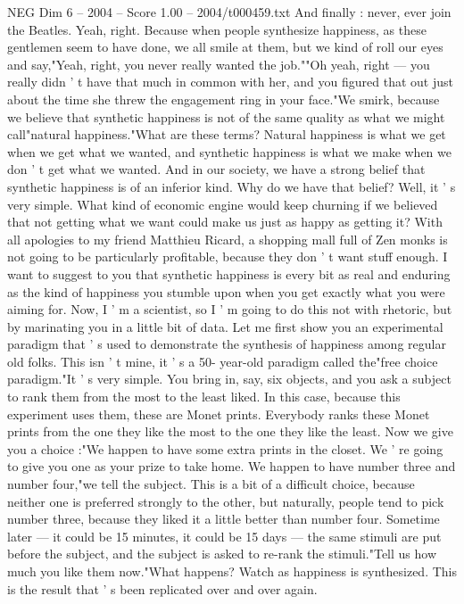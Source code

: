 \begin{textsample}{NEG Dim 6 – 2004 – Score 1.00 – 2004/t000459.txt}
And finally : never, ever join the Beatles.
Yeah, right.
Because when people synthesize happiness, as these gentlemen seem to have done, we all smile at them, but we kind of roll our eyes and say,"Yeah, right, you never really wanted the job.""Oh yeah, right — you really didn ' t have that much in common with her, and you figured that out just about the time she threw the engagement ring in your face."We smirk, because we believe that synthetic happiness is not of the same quality as what we might call"natural happiness."What are these terms?
Natural happiness is what we get when we get what we wanted, and synthetic happiness is what we make when we don ' t get what we wanted.
And in our society, we have a strong belief that synthetic happiness is of an inferior kind.
Why do we have that belief?
Well, it ' s very simple.
What kind of economic engine would keep churning if we believed that not getting what we want could make us just as happy as getting it?
With all apologies to my friend Matthieu Ricard, a shopping mall full of Zen monks is not going to be particularly profitable, because they don ' t want stuff enough.
I want to suggest to you that synthetic happiness is every bit as real and enduring as the kind of happiness you stumble upon when you get exactly what you were aiming for.
Now, I ' m a scientist, so I ' m going to do this not with rhetoric, but by marinating you in a little bit of data.
Let me first show you an experimental paradigm that ' s used to demonstrate the synthesis of happiness among regular old folks.
This isn ' t mine, it ' s a 50- year-old paradigm called the"free choice paradigm."It ' s very simple.
You bring in, say, six objects, and you ask a subject to rank them from the most to the least liked.
In this case, because this experiment uses them, these are Monet prints.
Everybody ranks these Monet prints from the one they like the most to the one they like the least.
Now we give you a choice :"We happen to have some extra prints in the closet.
We ' re going to give you one as your prize to take home.
We happen to have number three and number four,"we tell the subject.
This is a bit of a difficult choice, because neither one is preferred strongly to the other, but naturally, people tend to pick number three, because they liked it a little better than number four.
Sometime later — it could be 15 minutes, it could be 15 days — the same stimuli are put before the subject, and the subject is asked to re-rank the stimuli."Tell us how much you like them now."What happens?
Watch as happiness is synthesized.
This is the result that ' s been replicated over and over again.

\end{textsample}
